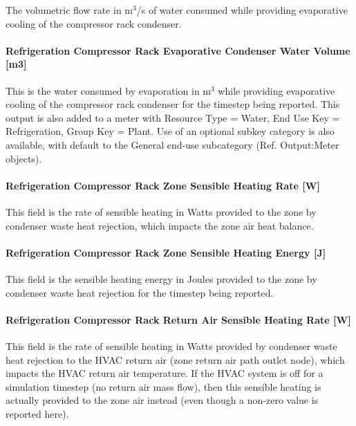 The volumetric flow rate in m\(^{3}\)/s of water consumed while providing evaporative cooling of the compressor rack condenser.

\paragraph{Refrigeration Compressor Rack Evaporative Condenser Water Volume {[}m3{]}}\label{refrigeration-compressor-rack-evaporative-condenser-water-volume-m3}

This is the water consumed by evaporation in m\(^{3}\) while providing evaporative cooling of the compressor rack condenser for the timestep being reported. This output is also added to a meter with Resource Type = Water, End Use Key = Refrigeration, Group Key = Plant. Use of an optional subkey category is also available, with default to the General end-use subcategory (Ref. Output:Meter objects).

\paragraph{Refrigeration Compressor Rack Zone Sensible Heating Rate {[}W{]}}\label{refrigeration-compressor-rack-zone-sensible-heating-rate-w}

This field is the rate of sensible heating in Watts provided to the zone by condenser waste heat rejection, which impacts the zone air heat balance.

\paragraph{Refrigeration Compressor Rack Zone Sensible Heating Energy {[}J{]}}\label{refrigeration-compressor-rack-zone-sensible-heating-energy-j}

This field is the sensible heating energy in Joules provided to the zone by condenser waste heat rejection for the timestep being reported.

\paragraph{Refrigeration Compressor Rack Return Air Sensible Heating Rate {[}W{]}}\label{refrigeration-compressor-rack-return-air-sensible-heating-rate-w}

This field is the rate of sensible heating in Watts provided by condenser waste heat rejection to the HVAC return air (zone return air path outlet node), which impacts the HVAC return air temperature. If the HVAC system is off for a simulation timestep (no return air mass flow), then this sensible heating is actually provided to the zone air instead (even though a non-zero value is reported here).

